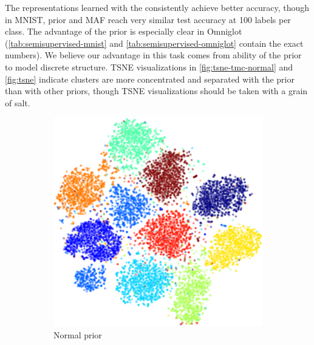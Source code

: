 The representations
learned with the \acronym\;
consistently achieve better accuracy,
though  in MNIST, \acronym\;prior
and MAF reach very similar test
accuracy at 100 labels per class.
The advantage of the \acronym\;prior is especially clear
in Omniglot
(\autoref{tab:semisupervised-mnist}
and \autoref{tab:semisupervised-omniglot} contain the exact numbers).
We believe our advantage in this task
comes from ability of the \acronym\;prior
to model discrete structure.
TSNE visualizations
in \autoref{fig:tsne-tmc-normal} and \autoref{fig:tsne}
indicate
clusters are more concentrated and separated
with the \acronym\;prior
than with other priors,
though TSNE visualizations should be
taken with a grain of salt.

\begin{figure}[H]
\centering
\begin{subfigure}[t]{0.2\textwidth}
    \centering
    \includegraphics[width=\textwidth]{img/loracs/mnist/tsne/mnist2-tsne-normal.png}
    \caption{Normal prior}
\end{subfigure}
\begin{subfigure}[t]{0.2\textwidth}
    \centering

\end{subfigure}
\end{figure}
